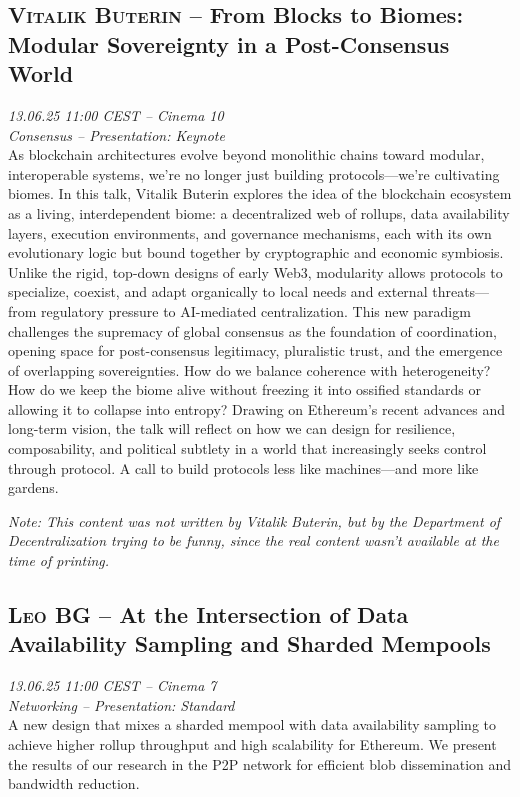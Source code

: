 \clearpage
\subsection {\textsc{Vitalik Buterin}  -- From Blocks to Biomes: Modular Sovereignty in a Post-Consensus World} \noindent \textit {13.06.25 11:00 CEST -- Cinema 10\\ Consensus -- Presentation: Keynote}\\[1em] As blockchain architectures evolve beyond monolithic chains toward modular, interoperable systems, we’re no longer just building protocols—we’re cultivating biomes. In this talk, Vitalik Buterin explores the idea of the blockchain ecosystem as a living, interdependent biome: a decentralized web of rollups, data availability layers, execution environments, and governance mechanisms, each with its own evolutionary logic but bound together by cryptographic and economic symbiosis. Unlike the rigid, top-down designs of early Web3, modularity allows protocols to specialize, coexist, and adapt organically to local needs and external threats—from regulatory pressure to AI-mediated centralization. This new paradigm challenges the supremacy of global consensus as the foundation of coordination, opening space for post-consensus legitimacy, pluralistic trust, and the emergence of overlapping sovereignties. How do we balance coherence with heterogeneity? How do we keep the biome alive without freezing it into ossified standards or allowing it to collapse into entropy? Drawing on Ethereum’s recent advances and long-term vision, the talk will reflect on how we can design for resilience, composability, and political subtlety in a world that increasingly seeks control through protocol. A call to build protocols less like machines—and more like gardens.

\emph{Note: This content was not written by Vitalik Buterin, but by the Department of Decentralization trying to be funny, since the real content wasn’t available at the time of printing.}

\clearpage
\subsection {\textsc{Leo BG}  -- At the Intersection of Data Availability Sampling and Sharded Mempools} \noindent \textit {13.06.25 11:00 CEST -- Cinema 7\\ Networking -- Presentation: Standard}\\[1em] A new design that mixes a sharded mempool with data availability sampling to achieve higher rollup throughput and high scalability for Ethereum. We present the results of our research in the P2P network for efficient blob dissemination and bandwidth reduction.


